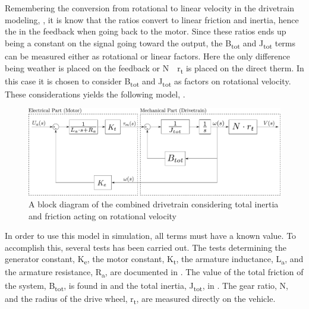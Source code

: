 Remembering the conversion from rotational to linear velocity in the drivetrain modeling, , it is know that the ratios convert to linear friction and inertia, hence the \si{} in the feedback when going back to the motor. Since these ratios ends up being a constant on the signal going toward the output, the \si{B_{tot}} and \si{J_{tot}} terms can be measured either as rotational or linear factors. Here the only difference being weather \si{} is placed on the feedback or \si{N\cdot r_t} is placed on the direct therm. In this case it is chosen to consider \si{B_{tot}} and \si{J_{tot}} as factors on rotational velocity. These considerations yields the following model, .
%
\begin{figure}[H]
	\centering
	\includegraphics[width=\textwidth]{figures/totalVelocityModelDiagramNotComplicated.pdf}
	\caption{A block diagram of the combined drivetrain considering total inertia and friction acting on rotational velocity}
	\label{fig:BlockDiagramDrivetrainNotComplicated}
\end{figure}
%
In order to use this model in simulation, all terms must have a known value. To accomplish this, several tests has been carried out. The tests determining the generator constant, \si{K_e}, the motor constant, \si{K_t}, the armature inductance, \si{L_a}, and the armature resistance, \si{R_a}, are documented in . The value of the total friction of the system, \si{B_{tot}}, is found in  and the total inertia, \si{J_{tot}}, in . The gear ratio, \si{N}, and the radius of the drive wheel, \si{r_t}, are measured directly on the vehicle.